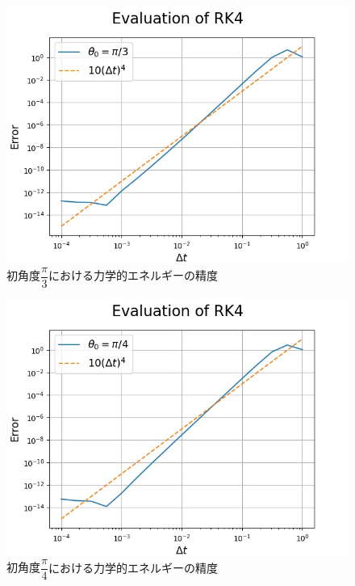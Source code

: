 \documentclass[a4paper,11pt]{jsarticle}
\begin{document}
\begin{figure}[H]
  \begin{center}
    \includegraphics[scale=0.8]{figure/RK41/evaluation1/pi3_2021-2-9-222927.jpeg}
    \caption{初角度\(\dfrac{\pi}{3}における力学的エネルギーの精度\)}
    \label{fig:RK41_eval1_2}
  \end{center}
\end{figure}
\begin{figure}[H]
  \begin{center}
    \includegraphics[scale=0.8]{figure/RK41/evaluation1/pi4_2021-2-9-222927.jpeg}
    \caption{初角度\(\dfrac{\pi}{4}における力学的エネルギーの精度\)}
    \label{fig:RK41_eval1_3}
  \end{center}
\end{figure}
\end{document}
